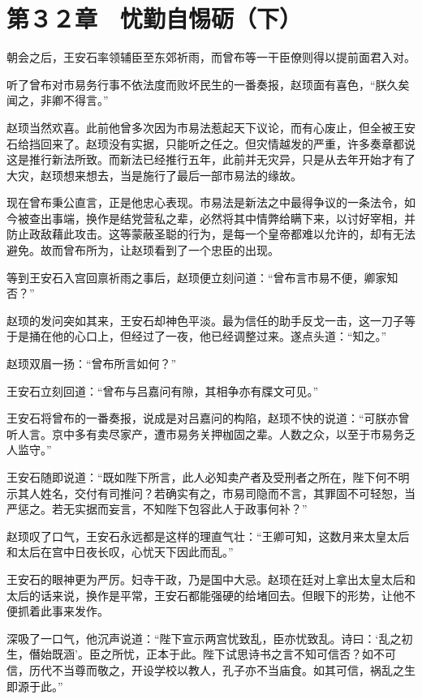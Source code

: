 \section{第３２章　忧勤自惕砺（下）}

朝会之后，王安石率领辅臣至东郊祈雨，而曾布等一干臣僚则得以提前面君入对。

听了曾布对市易务行事不依法度而败坏民生的一番奏报，赵顼面有喜色，“朕久矣闻之，非卿不得言。”

赵顼当然欢喜。此前他曾多次因为市易法惹起天下议论，而有心废止，但全被王安石给挡回来了。赵顼没有实据，只能听之任之。但灾情越发的严重，许多奏章都说这是推行新法所致。而新法已经推行五年，此前并无灾异，只是从去年开始才有了大灾，赵顼想来想去，当是施行了最后一部市易法的缘故。

现在曾布秉公直言，正是他忠心表现。市易法是新法之中最得争议的一条法令，如今被查出事端，换作是结党营私之辈，必然将其中情弊给瞒下来，以讨好宰相，并防止政敌藉此攻击。这等蒙蔽圣聪的行为，是每一个皇帝都难以允许的，却有无法避免。故而曾布所为，让赵顼看到了一个忠臣的出现。

等到王安石入宫回禀祈雨之事后，赵顼便立刻问道：“曾布言市易不便，卿家知否？”

赵顼的发问突如其来，王安石却神色平淡。最为信任的助手反戈一击，这一刀子等于是捅在他的心口上，但经过了一夜，他已经调整过来。遂点头道：“知之。”

赵顼双眉一扬：“曾布所言如何？”

王安石立刻回道：“曾布与吕嘉问有隙，其相争亦有牒文可见。”

王安石将曾布的一番奏报，说成是对吕嘉问的构陷，赵顼不快的说道：“可朕亦曾听人言。京中多有卖尽家产，遭市易务关押枷固之辈。人数之众，以至于市易务乏人监守。”

王安石随即说道：“既如陛下所言，此人必知卖产者及受刑者之所在，陛下何不明示其人姓名，交付有司推问？若确实有之，市易司隐而不言，其罪固不可轻恕，当严惩之。若无实据而妄言，不知陛下包容此人于政事何补？”

赵顼叹了口气，王安石永远都是这样的理直气壮：“王卿可知，这数月来太皇太后和太后在宫中日夜长叹，心忧天下因此而乱。”

王安石的眼神更为严厉。妇寺干政，乃是国中大忌。赵顼在廷对上拿出太皇太后和太后的话来说，换作是平常，王安石都能强硬的给堵回去。但眼下的形势，让他不便抓着此事来发作。

深吸了一口气，他沉声说道：“陛下宣示两宫忧致乱，臣亦忧致乱。诗曰：‘乱之初生，僭始既涵’。臣之所忧，正本于此。陛下试思诗书之言不知可信否？如不可信，历代不当尊而敬之，开设学校以教人，孔子亦不当庙食。如其可信，祸乱之生即源于此。”

